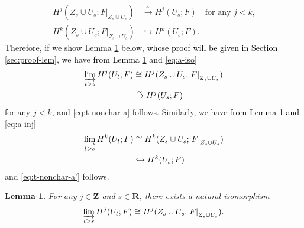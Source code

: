 ﻿\documentclass[a4paper,leqno,dvipdfmx]{jsarticle}
\makeatletter
\newtheorem{Lemma+}[Axiom+]{Lemma}
\theoremstyle{definition}
\newcommand{\zz}{\mathbf{Z}}
\newcommand{\rr}{\mathbf{R}}
\renewenvironment{proof}[1][\proofname]{\par
  \pushQED{\qed}%
  \normalfont \topsep6\p@\@plus6\p@\relax
  \trivlist
  \item[\hskip\labelsep
         \bfseries
    {#1}]\ignorespaces
}{%
  \popQED\endtrivlist\@endpefalse
}
\renewcommand{\proofname}{Proof.}
\numberwithin{equation}{section}
\newcommand{\simar}{\mathrel{\overset{\sim}{\rightarrow}}}%
\newcommand{\indlim}[1][]{\mathop{\varinjlim}\limits_{#1}}
\newcommand{\mres}[2][]{{\left.{#1}\right\rvert}_{#2}}
\theoremstyle{mystyle}
\makeatother
\begin{document}
\begin{proof}[{\textcolor{black}{Proof of Theorem \ref{prp:t-nonchar}}}]
\begin{align}
    H^{j}(Z_{s}\cup U_{s};\mres[F]{Z_{s}\cup U_{s}})
    &\simar
    H^{j}(U_{s};F)\quad
    \text{for any \(j< k\),}\\
    \label{eq:a-inj}
    H^{k}(Z_{s}\cup U_{s};\mres[F]{Z_{s}\cup U_{s}})
    &\hookrightarrow
    H^{k}(U_{s};F).
  \end{align}
  Therefore, if we show Lemma \ref{clm:ind-nonchar} below, 
  \textcolor{black}{whose proof will be given in Section \ref{sec:proof-lem},}
  we have \textcolor{black}{from Lemma \ref{clm:ind-nonchar} and \eqref{eq:a-iso}}
  \begin{align*}
    \indlim[t>s]H^{j}(U_t;F)
    &\cong 
    H^{j}(Z_{s}\cup U_{s};\mres[F]{Z_{s}\cup U_{s}})\\
    &\simar
    H^{j}(U_s;F)
  \end{align*}
  for any \(j<k\), and \ref{eq:t-nonchar-a} follows. 
  Similarly, 
  we have \textcolor{black}{from Lemma \ref{clm:ind-nonchar} and \eqref{eq:a-inj}}
  \begin{align*}
    \indlim[t>s]H^{k}(U_t;F)
    &\cong 
    H^{k}(Z_{s}\cup U_{s};\mres[F]{Z_{s}\cup U_{s}})\\
    &\hookrightarrow
    H^{k}(U_s;F)
  \end{align*}
  and \ref{eq:t-nonchar-a'} follows. 
  \begin{Lemma+}\label{clm:ind-nonchar}
    For any \(j\in\zz\) and \(s\in\rr\), there exists a natural isomorphism 
    \[
      \indlim[t>s]H^{j}(U_t;F)
      \cong 
      H^{j}(Z_{s}\cup U_{s};\mres[F]{Z_{s}\cup U_{s}}).
    \]
  \end{Lemma+}


\end{proof}
\end{document}
